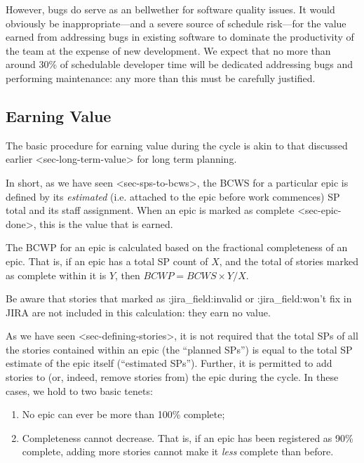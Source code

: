 However, bugs do serve as an bellwether for software quality issues. It
would obviously be inappropriate---and a severe source of schedule
risk---for the value earned from addressing bugs in existing software to
dominate the productivity of the team at the expense of new development.
We expect that no more than around 30\% of schedulable developer time
will be dedicated addressing bugs and performing maintenance: any more
than this must be carefully justified.

\subsection{Earning Value}\label{earning-value}

The basic procedure for earning value during the cycle is akin to that
discussed earlier \textless{}sec-long-term-value\textgreater{} for long
term planning.

In short, as we have seen \textless{}sec-sps-to-bcws\textgreater{}, the
BCWS for a particular epic is defined by its \emph{estimated} (i.e.
attached to the epic before work commences) SP total and its staff
assignment. When an epic
is marked as complete \textless{}sec-epic-done\textgreater{}, this is
the value that is earned.

The BCWP for an epic is calculated based on the fractional completeness
of an epic. That is, if an epic has a total SP count of \(X\), and the
total of stories marked as complete within it is \(Y\), then
\(BCWP = BCWS \times Y / X\).

Be aware that stories that marked as :jira\_field:invalid or
:jira\_field:won't fix in JIRA are not included in this calculation:
they earn no value.

As we have seen \textless{}sec-defining-stories\textgreater{}, it is not
required that the total SPs of all the stories contained within an epic
(the ``planned SPs'') is equal to the total SP estimate of the epic
itself (``estimated SPs''). Further, it is permitted to add stories to
(or, indeed, remove stories from) the epic during the cycle. In these
cases, we hold to two basic tenets:

\begin{enumerate}
\item
  No epic can ever be more than 100\% complete;
\item
  Completeness cannot decrease. That is, if an epic has been registered
  as 90\% complete, adding more stories cannot make it \emph{less}
  complete than before.
\end{enumerate}

